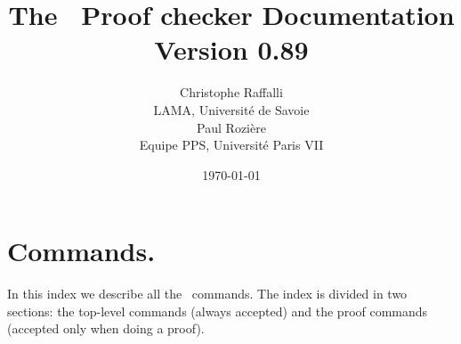 \documentclass[twoside,11pt,a4paper]{book}
\title{The \AFD\ Proof checker Documentation \\
                {\footnotesize Version 0.89}}
\date{\today}
\author{Christophe Raffalli \\
        LAMA, Universit\'e de Savoie\\
        Paul Rozi\`ere\\
        Equipe PPS, Universit\'e Paris VII
}
\begin{document}
\maketitle

\tableofcontents





















\appendix

\chapter{Commands.}\label{cmd}

In this index we describe all the \AFD\ commands. The index is divided in two
sections: the top-level commands (always accepted) and the proof commands
(accepted only when doing a proof).











\end{document}
